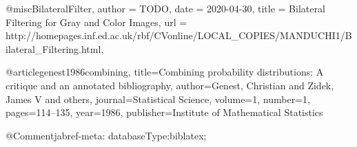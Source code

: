 
@misc{BilateralFilter,
  author = {TODO},
  date   = {2020-04-30},
  title  = {Bilateral Filtering for Gray and Color Images},
  url    = {http://homepages.inf.ed.ac.uk/rbf/CVonline/LOCAL_COPIES/MANDUCHI1/Bilateral_Filtering.html},
}

@article{genest1986combining,
  title={Combining probability distributions: A critique and an annotated bibliography},
  author={Genest, Christian and Zidek, James V and others},
  journal={Statistical Science},
  volume={1},
  number={1},
  pages={114--135},
  year={1986},
  publisher={Institute of Mathematical Statistics}
}

@Comment{jabref-meta: databaseType:biblatex;}
